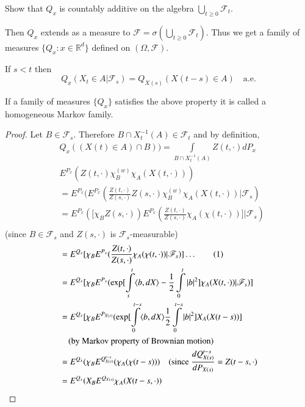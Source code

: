 \begin{exer*}
Show that $Q_{x}$ is countably additive on the algebra
$\bigcup\limits_{t\geq 0}\mathscr{F}_{t}$.

Then $Q_{x}$ extends as a measure to
$\mathscr{F}=\sigma(\bigcup\limits_{t\geq
      0}\mathscr{F}_{t})$. Thus we get a family of measures
$\{Q_{x}:x\in \mathbb{R}^{d}\}$ defined on $(\Omega,\mathscr{F})$.
\end{exer*}

\begin{prop*}
If $s<t$ then
$$
Q_{x}(X_{t}\in A|\mathscr{F}_{s})=Q_{X(s)}(X(t-s)\in
A)\quad\text{a.e.}
$$
\end{prop*}

\begin{defi*}
If a family of measures $\{Q_{x}\}$ satisfies the above property it is
called a homogeneous Markov family.
\end{defi*}

\begin{proof}
Let $B\in \mathscr{F}_{s}$. Therefore $B\cap X^{-1}_{t}(A)\in
\mathscr{F}_{t}$ and by definition,
\begin{align*}
& Q_{x}((X(t)\in A)\cap B))=\int\limits_{B\cap
    X_{t}^{-1}(A)}Z(t,\cdot)dP_{x}\\
& E^{P_{x}}(Z(t,\cdot)\chi^{(w)}_{B}\chi_{A}(X(t,\cdot)))\\
&=
  E^{P_{x}}(E^{P_{x}}(\frac{Z(t,\cdot)}{Z(s,\cdot)}Z(s,\cdot)\chi^{(w)}_{B}\chi_{A}(X(t,\cdot))|\mathscr{F}_{s})\\
&= E^{P_{x}}([\chi_{B}Z(s,\cdot))E^{P_{x}}(\frac{Z(t,\cdot)}{Z(s,\cdot)}\chi_{A}(\chi(t,\cdot))]|\mathscr{F}_{s})\\
\end{align*}
(since $B\in\mathscr{F}_{s}$ and $Z(s,\cdot)$ is
$\mathscr{F}_{s}$-measurable)
\begin{align*}
&
 = E^{Q_{x}}[\chi_{B}E^{P_{x}}(\frac{Z(t,\cdot)}{Z(s,\cdot)}\chi_{A}(\chi(t,\cdot))|\mathscr{F}_{s})]\ldots\tag{1}\\
& = E^{Q_{x}}[\chi_{B}E^{P_{x}}(\exp[\int\limits^{t}_{s}\langle
      b,dX\rangle
      -\frac{1}{2}\int\limits^{t}_{0}|b|^{2}]\chi_{A}(X(t,\cdot))|\mathscr{F}_{s})]\\
&= E^{Q_{x}}[\chi_{B}E^{P_{X(s)}}(\exp [\int\limits^{t-s}_{0}\langle
     b,dX\rangle
     \frac{1}{2}\int\limits^{t-s}_{0}|b|^{2}]X_{A}(X(t-s))]\\
&\quad \text{(by Markov property of Brownian motion)}\\
&=
 E^{Q_{x}}(\chi_{B}E^{Q^{t-s}_{X(s)}}(\chi_{A}(\chi(t-s)))\quad(\text{since~
 }\frac{dQ^{t-s}_{X(s)}}{dP_{X(s)}}=Z(t-s,\cdot)\\
&= E^{Q_{x}}(X_{B}E^{Q_{X(s)}}\chi_{A}(X(t-s,\cdot))
\end{align*}\pageoriginale
\end{proof}


